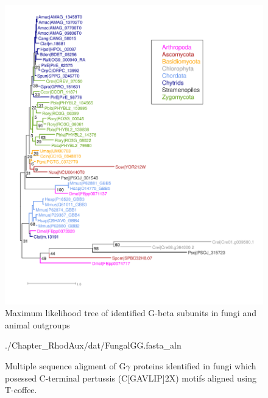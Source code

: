 

\begin{figure}[hb]
  \centering
  \includegraphics{./Chapter_RhodAux/img/Gbeta_tree.png}
  \caption[Gbeta tree]{Maximum likelihood tree of identified G-beta subunits in fungi and animal outgroups}
  \label{fig:ChRhodA_GbetaTree}
\end{figure}

\begin{figure}[hb]
  \centering
  \begin{texshade}{./Chapter_RhodAux/dat/FungalGG.fasta_aln}
    \hidenumbering
  \end{texshade}
  \caption[Galpha MSA]{Multiple sequence aligment of G$\gamma$ proteins identified in fungi which posessed C-terminal pertussis (C[GAVLIP]{2}X) motifs aligned using T-coffee.}
  \label{fig:ChRhodA_ggMSA}
\end{figure}

